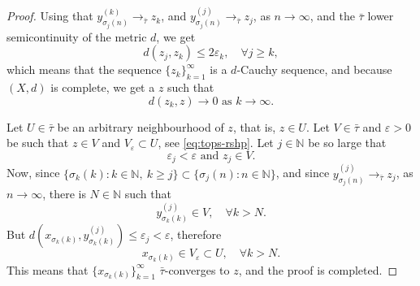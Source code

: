 \documentclass[10pt,a4paper]{amsart}
\begin{document}
\begin{proof}
    Using that
    $
         y_{\sigma_j(n)}^{(k)} \to_{\bar\tau} z_k$, and $  y_{\sigma_j(n)}^{(j)} \to_{\bar\tau} z_j$, as $n\to \infty$,
        and the $\bar\tau$ lower semicontinuity of the metric $d$, we get
    $$
        d(z_j,z_k) \le 2 \varepsilon_k,\quad\forall j \ge k,
    $$
    which means that the sequence $\{z_k\}_{k=1}^\infty$ is a $d$-Cauchy sequence, and because $(X,d)$ is complete, we get a $z$ such that
    $$
         d(z_k,z) \to 0\text{ as } k\to \infty.
    $$

    Let $U\in\bar\tau$ be an arbitrary neighbourhood of $z$, that is, $z\in U$. Let $V\in\bar\tau$ and $\varepsilon>0$ be such that $z\in V$ and $V_\varepsilon\subset U$, see \eqref{eq:tops-rshp}. Let $j\in\mathbb{N}$ be so large that
    $$
        \varepsilon_j < \varepsilon\text{ and }z_j\in V.
    $$
    Now, since $
        \{\sigma_k(k):k\in\mathbb{N},\ k\ge j\} \subset \{\sigma_j(n): n\in\mathbb{N}\}$,
    and since $y_{\sigma_j(n)}^{(j)} \to_{\bar\tau} z_j$, as $n\to \infty$, there is $N\in\mathbb{N}$ such that
    $$
        y^{(j)}_{\sigma_k(k)} \in V,\quad \forall k > N.
    $$
    But $d(x_{\sigma_k(k)},y^{(j)}_{\sigma_k(k)}) \le \varepsilon_j < \varepsilon$, therefore
    $$
        x_{\sigma_k(k)} \in V_\varepsilon \subset U,\quad \forall k > N.
    $$
    This means that $\{x_{\sigma_k(k)}\}_{k=1}^\infty$ $\bar\tau$-converges to $z$, and the proof is  completed.
\end{proof}
\end{document}

